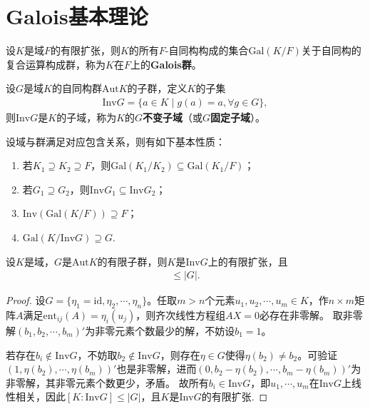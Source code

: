 \documentclass[../../main.tex]{subfiles}%
\begin{document}
\section{Galois基本理论}

\begin{definition}
设$K$是域$F$的有限扩张，则$K$的所有$F$-自同构构成的集合$\mathrm{Gal}(K/F)$关于自同构的复合运算构成群，称为$K$在$F$上的\textbf{Galois群}。
\end{definition}

\begin{definition}
设$G$是域$K$的自同构群$\mathrm{Aut}K$的子群，定义$K$的子集
\begin{align*}
\mathrm{Inv}G=\{a\in K\mid g(a)=a,\forall g\in G\},
\end{align*}
则$\mathrm{Inv}G$是$K$的子域，称为$K$的$G$\textbf{不变子域}（或$G$\textbf{固定子域}）。
\end{definition}

\begin{proposition}
设域与群满足对应包含关系，则有如下基本性质：
\begin{enumerate}[(1)]
\item 若$K_1\supseteq K_2\supseteq F$，则$\mathrm{Gal}(K_1/K_2)\subseteq\mathrm{Gal}(K_1/F)$；
\item 若$G_1\supseteq G_2$，则$\mathrm{Inv}G_1\subseteq\mathrm{Inv}G_2$；
\item $\mathrm{Inv}(\mathrm{Gal}(K/F))\supseteq F$；
\item $\mathrm{Gal}(K/\mathrm{Inv}G)\supseteq G$.
\end{enumerate}
\end{proposition}

\begin{theorem}
设$K$是域，$G$是$\mathrm{Aut}K$的有限子群，则$K$是$\mathrm{Inv}G$上的有限扩张，且
\begin{align*}
[K:\mathrm{Inv}G]\leqslant|G|.
\end{align*}
\end{theorem}

\begin{proof}

设$G=\{\eta_1=\mathrm{id},\eta_2,\cdots,\eta_n\}$。任取$m>n$个元素$u_1,u_2,\cdots,u_m\in K$，作$n\times m$矩阵$A$满足$\mathrm{ent}_{ij}(A)=\eta_i(u_j)$，则齐次线性方程组$AX=0$必存在非零解。
取非零解$(b_1,b_2,\cdots,b_m)'$为非零元素个数最少的解，不妨设$b_1=1$。

若存在$b_i\notin\mathrm{Inv}G$，不妨取$b_2\notin\mathrm{Inv}G$，则存在$\eta\in G$使得$\eta(b_2)\neq b_2$。可验证$(1,\eta(b_2),\cdots,\eta(b_m))'$也是非零解，进而$(0,b_2-\eta(b_2),\cdots,b_m-\eta(b_m))'$为非零解，其非零元素个数更少，矛盾。
故所有$b_i\in\mathrm{Inv}G$，即$u_1,\cdots,u_m$在$\mathrm{Inv}G$上线性相关，因此$[K:\mathrm{Inv}G]\leqslant|G|$，且$K$是$\mathrm{Inv}G$的有限扩张.

\end{proof}
\end{document}
